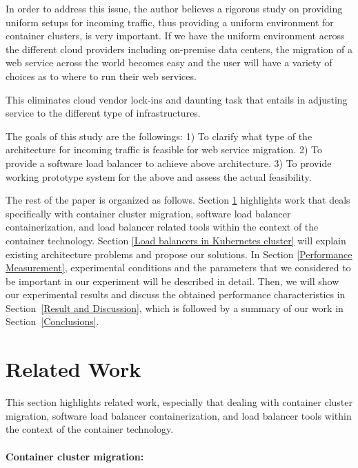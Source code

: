 In order to address this issue, the author believes a rigorous study on providing uniform setups for incoming traffic,
thus providing a uniform environment for container clusters, is very important.
If we have the uniform environment across the different    cloud providers    including on-premise data centers,
the migration of a web service across the world    becomes    easy and the user will have a variety of choices
as to where to run their web services.

This eliminates cloud vendor lock-ins and daunting task that entails in adjusting service to the different type of infrastructures.

The goals of this study are the followings:
1) To clarify what type of the architecture for incoming traffic is feasible for web service migration.
2) To provide a software load balancer to achieve above architecture.
3) To provide working prototype system for the above and assess the actual feasibility.

The rest of the paper is organized as follows.
Section \ref{Related Work} highlights work that deals specifically with container cluster migration, 
software load balancer containerization, and load balancer related tools within the context of the container technology. 
Section \ref{Load balancers in Kubernetes cluster} will explain existing architecture problems and propose our solutions.
In Section \ref{Performance Measurement}, experimental conditions and the parameters 
that we considered to be important in our experiment will be described in detail.
Then, we will show our experimental results and discuss the obtained performance characteristics in Section~\ref{Result and Discussion},  
which is followed by a summary of our work in Section~\ref{Conclusions}.

\section{Related Work}\label{Related Work}

This section highlights related work, especially that dealing with container cluster migration, 
software load balancer containerization, and load balancer tools within the context of the container technology.

\paragraph{\bf Container cluster migration:}

